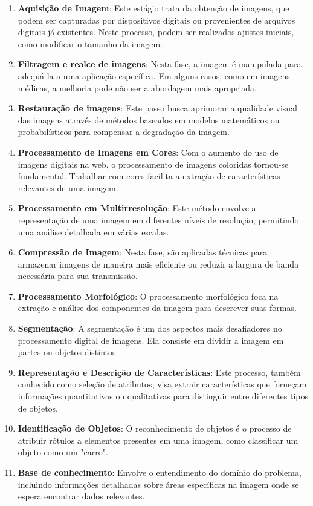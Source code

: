\begin{enumerate}
    \item \textbf{Aquisição de Imagem}: Este estágio trata da obtenção de imagens, que podem ser capturadas por dispositivos digitais ou provenientes de arquivos digitais já existentes. Neste processo, podem ser realizados ajustes iniciais, como modificar o tamanho da imagem.
    
    \item \textbf{Filtragem e realce de imagens}: Nesta fase, a imagem é manipulada para adequá-la a uma aplicação específica. Em alguns casos, como em imagens médicas, a melhoria pode não ser a abordagem mais apropriada.

    \item \textbf{Restauração de imagens}: Este passo busca aprimorar a qualidade visual das imagens através de métodos baseados em modelos matemáticos ou probabilísticos para compensar a degradação da imagem.

    \item \textbf{Processamento de Imagens em Cores}: Com o aumento do uso de imagens digitais na web, o processamento de imagens coloridas tornou-se fundamental. Trabalhar com cores facilita a extração de características relevantes de uma imagem.

    \item \textbf{Processamento em Multirresolução}: Este método envolve a representação de uma imagem em diferentes níveis de resolução, permitindo uma análise detalhada em várias escalas.

    \item \textbf{Compressão de Imagem}: Nesta fase, são aplicadas técnicas para armazenar imagens de maneira mais eficiente ou reduzir a largura de banda necessária para sua transmissão.

    \item \textbf{Processamento Morfológico}: O processamento morfológico foca na extração e análise dos componentes da imagem para descrever suas formas.

    \item \textbf{Segmentação}: A segmentação é um dos aspectos mais desafiadores no processamento digital de imagens. Ela consiste em dividir a imagem em partes ou objetos distintos.

    \item \textbf{Representação e Descrição de Características}: Este processo, também conhecido como seleção de atributos, visa extrair características que forneçam informações quantitativas ou qualitativas para distinguir entre diferentes tipos de objetos.

    \item \textbf{Identificação de Objetos}: O reconhecimento de objetos é o processo de atribuir rótulos a elementos presentes em uma imagem, como classificar um objeto como um "carro".

    \item \textbf{Base de conhecimento}: Envolve o entendimento do domínio do problema, incluindo informações detalhadas sobre áreas específicas na imagem onde se espera encontrar dados relevantes.

    
\end{enumerate}

